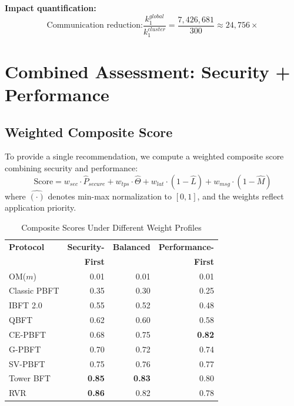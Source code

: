 \documentclass[10pt,twocolumn,letterpaper]{article}
\begin{document}
\textbf{Impact quantification:}
\begin{equation}
\text{Communication reduction:} \frac{k_1^{global}}{k_1^{cluster}} = \frac{7{,}426{,}681}{300} \approx 24{,}756\times
\end{equation}

\section{Combined Assessment: Security + Performance}
\label{sec:combined}

\subsection{Weighted Composite Score}

To provide a single recommendation, we compute a weighted composite score combining security and performance:
\begin{equation}
\text{Score} = w_{sec} \cdot \hat{P}_{secure} + w_{tps} \cdot \hat{\Theta} + w_{lat} \cdot (1 - \hat{L}) + w_{msg} \cdot (1 - \hat{M})
\end{equation}
where $\hat{(\cdot)}$ denotes min-max normalization to $[0,1]$, and the weights reflect application priority.

\begin{table}[htbp]
\caption{Composite Scores Under Different Weight Profiles}
\label{tab:composite}
\centering
\scriptsize
\begin{tabular}{@{}lrrr@{}}
\toprule
\textbf{Protocol} & \textbf{Security-} & \textbf{Balanced} & \textbf{Performance-} \\
 & \textbf{First} & & \textbf{First} \\
\midrule
OM($m$) & 0.01 & 0.01 & 0.01 \\
Classic PBFT & 0.35 & 0.30 & 0.25 \\
IBFT 2.0 & 0.55 & 0.52 & 0.48 \\
QBFT & 0.62 & 0.60 & 0.58 \\
CE-PBFT & 0.68 & 0.75 & \textbf{0.82} \\
G-PBFT & 0.70 & 0.72 & 0.74 \\
SV-PBFT & 0.75 & 0.76 & 0.77 \\
Tower BFT & \textbf{0.85} & \textbf{0.83} & 0.80 \\
RVR & \textbf{0.86} & 0.82 & 0.78 \\
\bottomrule
\end{tabular}
\end{table}
\end{document}
